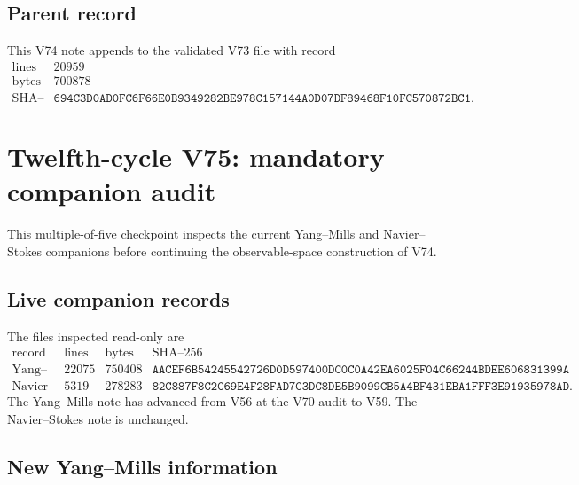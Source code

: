 \documentclass[11pt]{article}
\theoremstyle{remark}
\begin{document}
\subsection{Parent record}

This V74 note appends to the validated V73 file with record
\[
\begin{array}{c|c}
\text{lines}&20959\\
\text{bytes}&700878\\
\text{SHA--256}&
\texttt{694C3D0AD0FC6F66E0B9349282BE978C157144A0D07DF89468F10FC570872BC1}.
\end{array}
\]



\section{Twelfth-cycle V75: mandatory companion audit}
\label{sec:v12v75}

This multiple-of-five checkpoint inspects the current Yang--Mills and
Navier--Stokes companions before continuing the observable-space
construction of V74.

\subsection{Live companion records}

The files inspected read-only are
\[
\begin{array}{c|r|r|c}
\text{record}&\text{lines}&\text{bytes}&\text{SHA--256}\\ \hline
\text{Yang--Mills V59}&22075&750408&
\texttt{AACEF6B54245542726D0D597400DC0C0A42EA6025F04C66244BDEE606831399A}\\
\text{Navier--Stokes V26}&5319&278283&
\texttt{82C887F8C2C69E4F28FAD7C3DC8DE5B9099CB5A4BF431EBA1FFF3E91935978AD}.
\end{array}                                                   \tag{75.1}
\]
The Yang--Mills note has advanced from V56 at the V70 audit to V59.
The Navier--Stokes note is unchanged.

\subsection{New Yang--Mills information}
\end{document}
